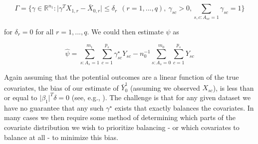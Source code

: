 \documentclass[aoas]{imsart}
\theoremstyle{plain}
\theoremstyle{remark}
\begin{document}
\begin{equation}\label{eqn:constraint}
\Gamma = \{\gamma \in \mathbb{R}^{n_1}: \lvert \gamma^TX_{1, r} - \bar{X}_{0, r} \lvert \le \delta_r \ \ (r = 1, ..., q), \ \gamma_{sc} > 0, \sum_{s, c: A_{sc} = 1}\gamma_{sc} = 1\}
\end{equation}

for $\delta_r = 0$ for all $r = 1, ..., q$. We could then estimate $\psi$ as

\begin{equation}\label{eqn:psi}
\hat{\psi} = \sum_{s: A_s = 1}^{m_1}\sum_{c = 1}^{p_s}\gamma_{sc}^\star Y_{sc} - n_0^{-1}\sum_{s: A_s = 0}^{m_0}\sum_{c = 1}^{p_s}Y_{sc}
\end{equation}

Again assuming that the potential outcomes are a linear function of the true covariates, the bias of our estimate of $\bar{Y}^1_0$ (assuming we observed $X_{sc}$), is less than or equal to $\lvert\beta_1\rvert^T\delta = 0$ (see, e.g., \cite{zubizarreta2015stable}). The challenge is that for any given dataset we have no guarantee that any such $\gamma^\star$ exists that exactly balances the covariates. In many cases we then require some method of determining which parts of the covariate distribution we wish to prioritize balancing - or which covariates to balance at all - to minimize this bias.
\end{document}

